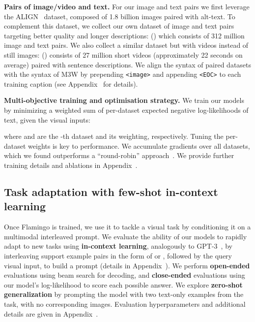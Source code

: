 \textbf{Pairs of image/video and text.}
For our image and text pairs we first leverage the ALIGN~\citep{align} dataset, composed of 1.8 billion images paired with alt-text.
To complement this dataset,  we collect our own dataset of image and text pairs targeting better quality and longer descriptions:  \shortimagetextpairs{} (\imagetextpairs) which consists of 312 million image and text pairs.
We also collect a similar dataset but with videos instead of still images: \shortvideotextpairs{} (\videotextpairs) consists of 27 million short videos (approximately 22 seconds on average) paired with sentence descriptions.
We align the syntax of paired datasets with the syntax of M3W by prepending \texttt{<image>} and appending \texttt{<EOC>} to each training caption (see Appendix~ for details).



\textbf{Multi-objective training and optimisation strategy.}
We train our models by minimizing a weighted sum of per-dataset expected negative log-likelihoods of text, given the visual inputs:

where  and  are the -th dataset and
its weighting, respectively.
Tuning the per-dataset weights  is key to performance.
We accumulate gradients over all datasets, which we found outperforms a ``round-robin'' approach~\citep{cho2021unifying}.
We provide further training details and ablations in Appendix~.

\subsection{Task adaptation with few-shot in-context learning}
\label{sec:adapt-vlm}

Once Flamingo is trained, we use it to tackle a visual task by conditioning it on a multimodal interleaved prompt. We evaluate the ability of our models to rapidly adapt to new tasks using \textbf{in-context learning}, analogously to GPT-3~\citep{gpt3}, by interleaving support example pairs in the form of  or , followed by the query visual input, to build a prompt (details in Appendix~).
We perform \textbf{open-ended} evaluations using beam search for decoding, and \textbf{close-ended} evaluations using our model's log-likelihood to score each possible answer.
We explore \textbf{zero-shot generalization} by prompting the model with two text-only examples from the task, with no corresponding images.
Evaluation hyperparameters and additional details are given in Appendix~.



